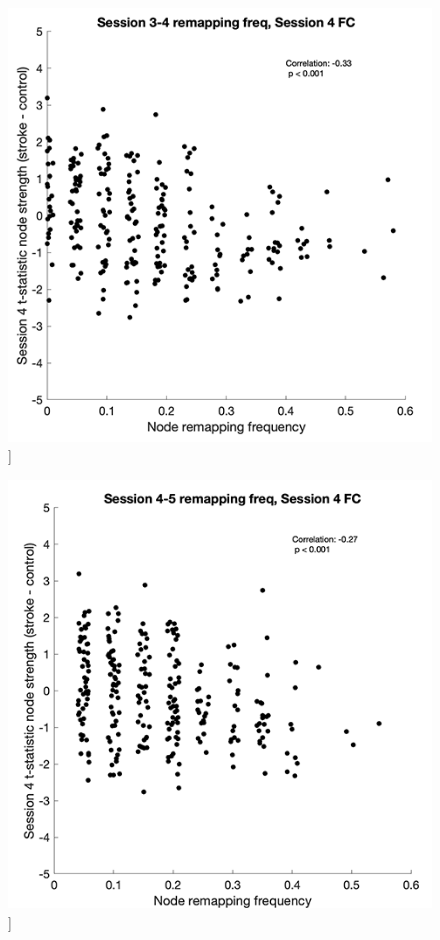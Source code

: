 \documentclass[phd,tocprelim]{cornell}
\renewcommand{\caption}[1]{\singlespacing\hangcaption{#1}\normalspacing}
\begin{document}
\null
\vfill
\clearpage
\null
\vfill
\begin{figure}[h!]
		\ContinuedFloat
		\captionsetup{labelformat=adja-page}
    \centering
    \includegraphics[width=\textwidth]{chapter1/SupplementaryFigure9F.png}
    \caption[]{}
\end{figure}
\null
\vfill
\clearpage
\null
\vfill
\begin{figure}[h!]
		\ContinuedFloat
		\captionsetup{labelformat=adja-page}
    \centering
    \includegraphics[width=\textwidth]{chapter1/SupplementaryFigure9G.png}
    \caption[]{}
\end{figure}
\end{document}
